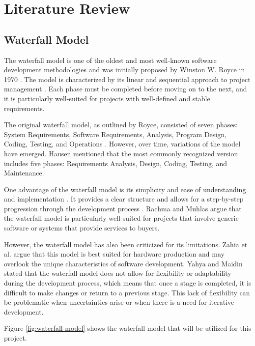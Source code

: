 \chapter{Literature Review}
\label{chapter:literature-review}

\section{Waterfall Model}
\label{sec:waterfall-model}

The waterfall model is one of the oldest and most well-known software development methodologies and was initially proposed by Winston W. Royce in 1970 \cite{royce70}. The model is characterized by its linear and sequential approach to project management \cite{Novianti2023}. Each phase must be completed before moving on to the next, and it is particularly well-suited for projects with well-defined and stable requirements.

The original waterfall model, as outlined by Royce, consisted of seven phases: System Requirements, Software Requirements, Analysis, Program Design, Coding, Testing, and Operations \cite{royce70}. However, over time, variations of the model have emerged. Hausen \cite{Hausen} mentioned that the most commonly recognized version includes five phases: Requirements Analysis, Design, Coding, Testing, and Maintenance.

One advantage of the waterfall model is its simplicity and ease of understanding and implementation \cite{Sunardi2020}. It provides a clear structure and allows for a step-by-step progression through the development process \cite{Sunardi2020}. Rachma and Muhlas \cite{Rachma2022} argue that the waterfall model is particularly well-suited for projects that involve generic software or systems that provide services to buyers.

However, the waterfall model has also been criticized for its limitations. Zahia et al. \cite{Zahia14} argue that this model is best suited for hardware production and may overlook the unique characteristics of software development. Yahya and Maidin \cite{Yahya2023} stated that the waterfall model does not allow for flexibility or adaptability during the development process, which means that once a stage is completed, it is difficult to make changes or return to a previous stage. This lack of flexibility can be problematic when uncertainties arise or when there is a need for iterative development.

Figure \ref{fig:waterfall-model} shows the waterfall model that will be utilized for this project.

